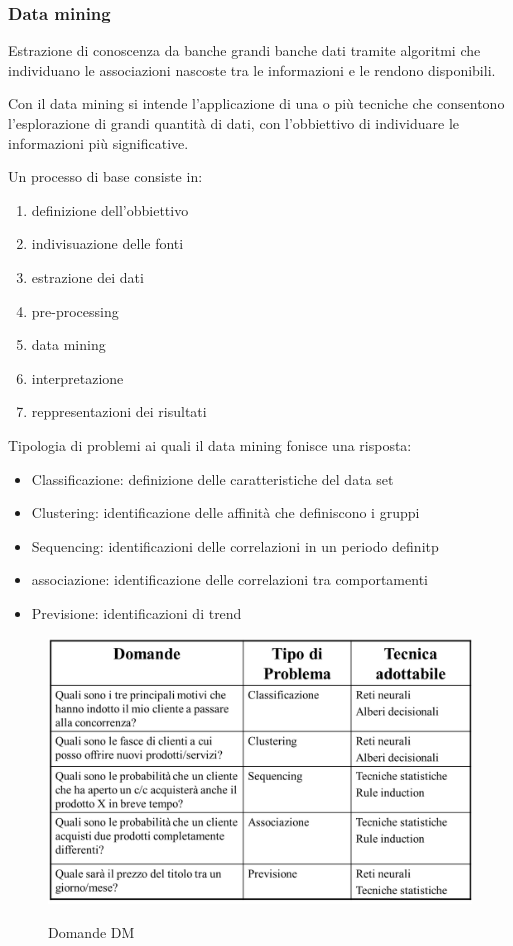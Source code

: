 \subsubsection{Data mining}
Estrazione di conoscenza da banche grandi banche dati tramite algoritmi che individuano
le associazioni nascoste tra le informazioni e le rendono disponibili.

Con il data mining si intende l'applicazione di una o più tecniche che consentono l'esplorazione
di grandi quantità di dati, con l'obbiettivo di individuare le informazioni più significative.


Un processo di base consiste in:
\begin{enumerate}
    \item definizione dell'obbiettivo
    \item indivisuazione delle fonti
    \item estrazione dei dati
    \item pre-processing
    \item data mining
    \item interpretazione
    \item reppresentazioni dei risultati
\end{enumerate}

Tipologia di problemi ai quali il data mining fonisce una risposta:
\begin{itemize}
    \item Classificazione: definizione delle caratteristiche del data set
    \item Clustering: identificazione delle affinità che definiscono i gruppi
    \item Sequencing: identificazioni delle correlazioni in un periodo definitp
    \item associazione: identificazione delle correlazioni tra comportamenti
    \item Previsione: identificazioni di trend
\end{itemize}

\begin{figure}[H]
    \centering
    \includegraphics[width=0.7\linewidth]{imgs/8 - dataming}
    \label{fig:data_mining_domande}
    \caption{Domande DM}
\end{figure}

